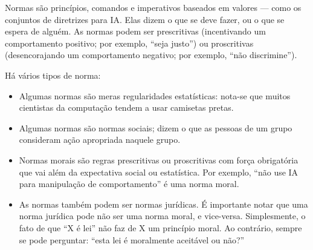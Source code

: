 \documentclass[
  11pt,
]{article}
\begin{document}
Normas são princípios, comandos e imperativos baseados em valores ---
como os conjuntos de diretrizes para IA. Elas dizem o que se deve fazer,
ou o que se espera de alguém. As normas podem ser prescritivas
(incentivando um comportamento positivo; por exemplo, ``seja justo'') ou
proscritivas (desencorajando um comportamento negativo; por exemplo,
``não discrimine'').

Há vários tipos de norma:

\begin{itemize}
\item
  Algumas normas são meras regularidades estatísticas: nota-se que
  muitos cientistas da computação tendem a usar camisetas pretas.
\item
  Algumas normas são normas sociais; dizem o que as pessoas de um grupo
  consideram ação apropriada naquele grupo.
\item
  Normas morais são regras prescritivas ou proscritivas com força
  obrigatória que vai além da expectativa social ou estatística. Por
  exemplo, ``não use IA para manipulação de comportamento'' é uma norma
  moral.
\item
  As normas também podem ser normas jurídicas. É importante notar que
  uma norma jurídica pode não ser uma norma moral, e vice-versa.
  Simplesmente, o fato de que ``X é lei'' não faz de X um princípio
  moral. Ao contrário, sempre se pode perguntar: ``esta lei é moralmente
  aceitável ou não?''
\end{itemize}
\end{document}
